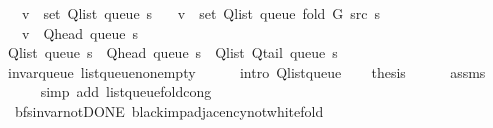 \begin{isabellebody}
\ \ \ {\isachardoublequoteopen}v\ {\isasymin}\ set\ {\isacharparenleft}{\kern0pt}Q{\isacharunderscore}{\kern0pt}list\ {\isacharparenleft}{\kern0pt}queue\ s{\isacharparenright}{\kern0pt}{\isacharparenright}{\kern0pt}{\isachardoublequoteclose}\isanewline
\ \ \ {\isachardoublequoteopen}v\ {\isasymnotin}\ set\ {\isacharparenleft}{\kern0pt}Q{\isacharunderscore}{\kern0pt}list\ {\isacharparenleft}{\kern0pt}queue\ {\isacharparenleft}{\kern0pt}fold\ G\ src\ s{\isacharparenright}{\kern0pt}{\isacharparenright}{\kern0pt}{\isacharparenright}{\kern0pt}{\isachardoublequoteclose}\isanewline
\ \ \ {\isachardoublequoteopen}v\ {\isacharequal}{\kern0pt}\ Q{\isacharunderscore}{\kern0pt}head\ {\isacharparenleft}{\kern0pt}queue\ s{\isacharparenright}{\kern0pt}{\isachardoublequoteclose}\isanewline
%
\isadelimproof
%
\endisadelimproof
%
\isatagproof
{}\isamarkupfalse%
\ {\isacharminus}{\kern0pt}\isanewline
\ \ \isamarkupfalse%
\ {\isachardoublequoteopen}Q{\isacharunderscore}{\kern0pt}list\ {\isacharparenleft}{\kern0pt}queue\ s{\isacharparenright}{\kern0pt}\ {\isacharequal}{\kern0pt}\ Q{\isacharunderscore}{\kern0pt}head\ {\isacharparenleft}{\kern0pt}queue\ s{\isacharparenright}{\kern0pt}\ {\isacharhash}{\kern0pt}\ Q{\isacharunderscore}{\kern0pt}list\ {\isacharparenleft}{\kern0pt}Q{\isacharunderscore}{\kern0pt}tail\ {\isacharparenleft}{\kern0pt}queue\ s{\isacharparenright}{\kern0pt}{\isacharparenright}{\kern0pt}{\isachardoublequoteclose}\isanewline
\ \ \ \ \isamarkupfalse%
\ invar{\isacharunderscore}{\kern0pt}queue\ list{\isacharunderscore}{\kern0pt}queue{\isacharunderscore}{\kern0pt}non{\isacharunderscore}{\kern0pt}empty\isanewline
\ \ \ \ \isamarkupfalse%
\ {\isacharparenleft}{\kern0pt}intro\ Q{\isachardot}{\kern0pt}list{\isacharunderscore}{\kern0pt}queue{\isacharparenright}{\kern0pt}\isanewline
\ \ \isamarkupfalse%
\ {\isacharquery}{\kern0pt}thesis\isanewline
\ \ \ \ \isamarkupfalse%
\ assms\isanewline
\ \ \ \ \isamarkupfalse%
\ {\isacharparenleft}{\kern0pt}simp\ add{\isacharcolon}{\kern0pt}\ list{\isacharunderscore}{\kern0pt}queue{\isacharunderscore}{\kern0pt}fold{\isacharunderscore}{\kern0pt}cong{\isacharparenright}{\kern0pt}\isanewline
{}\isamarkupfalse%
%
\endisatagproof
{\isafoldproof}%
%
\isadelimproof
\isanewline
%
\endisadelimproof
\isanewline
{}\isamarkupfalse%
\ {\isacharparenleft}{\kern0pt}\ bfs{\isacharunderscore}{\kern0pt}invar{\isacharunderscore}{\kern0pt}not{\isacharunderscore}{\kern0pt}DONE{\isacharparenright}{\kern0pt}\ black{\isacharunderscore}{\kern0pt}imp{\isacharunderscore}{\kern0pt}adjacency{\isacharunderscore}{\kern0pt}not{\isacharunderscore}{\kern0pt}white{\isacharunderscore}{\kern0pt}fold{\isacharcolon}{\kern0pt}\isanewline

\end{isabellebody}
